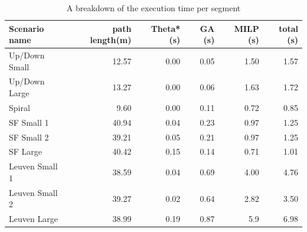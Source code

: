 \begin{table}[]
\centering
\begin{tabular}{ l | r | r | r | r | r}
Scenario name & path length(m) & Theta* (s) & GA (s) & MILP (s)  & total (s) \\
\hline
Up/Down Small 	& 12.57	& 0.00 	& 0.05 	& 1.50 	& 1.57 	\\ 
Up/Down Large 	& 13.27	& 0.00 	& 0.06 	& 1.63 	& 1.72 	\\
Spiral		 	& 9.60	& 0.00 	& 0.11	& 0.72	& 0.85	\\
SF Small 1		& 40.94 & 0.04 	& 0.23 	& 0.97 	& 1.25 	\\
SF Small 2		& 39.21	& 0.05 	& 0.21	& 0.97 	& 1.25 	\\
SF Large	 	& 40.42	& 0.15	& 0.14	& 0.71 	& 1.01 	\\
Leuven Small 1 	& 38.59	& 0.04 	& 0.69	& 4.00	& 4.76	\\
Leuven Small 2	& 39.27	& 0.02 	& 0.64	& 2.82 	& 3.50	\\
Leuven Large 	& 38.99	& 0.19	& 0.87	& 5.9 	& 6.98 	\\
\end{tabular}
\caption{A breakdown of the execution time per segment}
\label{table:gen-results-rel}
\end{table}


